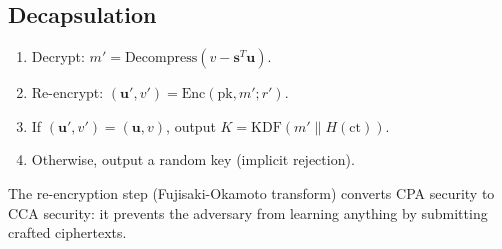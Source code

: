 \subsection{Decapsulation}

\begin{enumerate}[nosep]
  \item Decrypt: $m' = \text{Decompress}(v - \mathbf{s}^T \mathbf{u})$.
  \item Re-encrypt: $(\mathbf{u}', v') = \text{Enc}(\text{pk}, m'; r')$.
  \item If $(\mathbf{u}', v') = (\mathbf{u}, v)$, output $K = \text{KDF}(m' \| H(\text{ct}))$.
  \item Otherwise, output a random key (implicit rejection).
\end{enumerate}

The re-encryption step (Fujisaki-Okamoto transform) converts CPA security to CCA
security: it prevents the adversary from learning anything by submitting crafted
ciphertexts.

